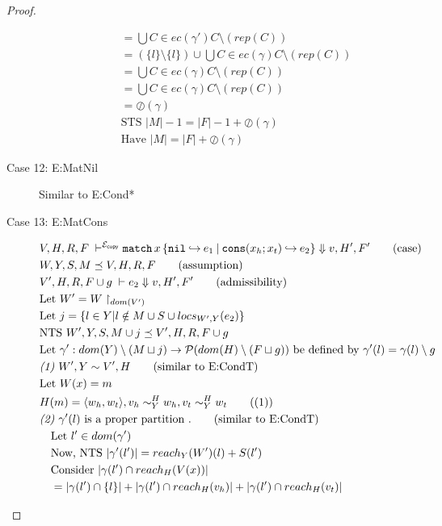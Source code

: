 \documentclass[11pt]{article}
\newcommand{\ms}[1]{\ensuremath{\mathsf{#1}}}
\newcommand{\veq}[4]{#3 \sim^{#1}_{#2} #4}
\newcommand{\oh}[1]{\oslash(#1)}
\newcommand{\copySem}{\ensuremath{\mathcal{E}_{\ms{copy}}}}
\theoremstyle{definition}
\begin{document}
\begin{proof}
\begin{description}
\begin{align*}
		&\quad = \bigcup C \in ec(\gamma') C \setminus (rep(C))\\
		&\quad = (\{l\} \setminus \{l\}) \cup \bigcup C \in ec(\gamma) C \setminus (rep(C))\\
		&\quad = \bigcup C \in ec(\gamma) C \setminus (rep(C))\\
		&\quad = \bigcup C \in ec(\gamma) C \setminus (rep(C))\\
		&\quad = \oh{\gamma}\\
		&\quad \text{STS } |M| - 1 = |F| - 1 + \oh{\gamma}\\
		&\quad \text{Have } |M| = |F| + \oh{\gamma} \tag{condition 5. of $\preceq$}
	\end{align*}
  \item[Case 12: E:MatNil]
  Similar to E:Cond*
  \item[Case 13: E:MatCons]
  \begin{align*}
		&V,H,R,F \; \vdash^{\copySem} \listcaseexcst{x}{e_1}{x_h}{x_t}{e_2} \Downarrow v,H',F' \tag{case}\\
		&W,Y,S,M \preceq V,H,R,F \tag{assumption}\\
		&V',H,R,F \cup g \; \vdash e_2 \Downarrow v, H',F' \tag{admissibility}\\
		&\text{Let } W' = W \restriction_{dom(V')}\\
		&\text{Let } j = \{l \in Y | l \notin M \cup S \cup locs_{W',Y}(e_2) \}\\
		&\text{NTS } W',Y,S,M \cup j \preceq V',H,R,F \cup g\\
		&\text{Let } \gamma' : dom(Y) \setminus (M \sqcup j) 
		\to \mathcal{P}(dom(H) \setminus (F \sqcup g)) \text{ be defined by } 
		\gamma'(l) = \gamma(l) \setminus g\\
		&\emph{(1) } W',Y \sim V',H \tag{similar to E:CondT}\\
		&\text{Let } W(x) = m\\
		&H(m) = \pairexcst{w_h}{w_t}, \veq{H}{Y}{v_h}{w_h},\veq{H}{Y}{v_t}{w_t} \tag{(1)} \\
		&\emph{(2) } \gamma'(l) \text{ is a proper partition }. \tag{similar to E:CondT}\\
		&\quad \text{Let } l' \in dom(\gamma')\\
		&\quad \text{Now, NTS } |\gamma'(l')| = reach_{Y}(W')(l) + S(l')\\
		&\quad \text{Consider } |\gamma(l') \cap reach_H(V(x))|\\
		&\quad = |\gamma(l') \cap \{l\}| + |\gamma(l') \cap reach_H(v_h)| 
			+ |\gamma(l') \cap reach_H(v_t)|\\ 

\end{align*}
\end{description}
\end{proof}
\end{document}
